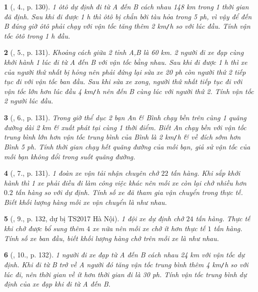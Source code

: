\documentclass{article}
\newtheorem{baitoan}{}
\begin{document}
\begin{baitoan}[\cite{Kien_dai_so_9}, 4., p. 130]
	1 ôtô dự định đi từ A đến B cách nhau {\rm148 km} trong 1 thời gian đã định. Sau khi đi được {\rm1 h} thì ôtô bị chắn bởi tàu hỏa trong {\rm5 ph}, vì vậy để đến B đúng giờ ôtô phải chạy với vận tốc tăng thêm {\rm2 km{\tt/}h} so với lúc đầu. Tính vận tốc ôtô trong {\rm1 h} đầu.
\end{baitoan}

\begin{baitoan}[\cite{Kien_dai_so_9}, 5., p. 131]
	Khoảng cách giữa 2 tỉnh A,B là {\rm60 km}. 2 người đi xe đạp cùng khởi hành 1 lúc đi từ A đến B với vận tốc bằng nhau. Sau khi đi được {\rm1 h} thì xe của người thứ nhất bị hỏng nên phải đứng lại sửa xe {\rm20 ph} còn người thứ 2 tiếp tục đi với vận tốc ban đầu. Sau khi sửa xe xong, người thứ nhất tiếp tục đi với vận tốc lớn hơn lúc đầu {\rm4 km{\tt/}h} nên đến B cùng lúc với người thứ 2. Tính vận tốc 2 người lúc đầu.
\end{baitoan}

\begin{baitoan}[\cite{Kien_dai_so_9}, 6., p. 131]
	Trong giờ thể dục 2 bạn An \& Bình chạy bền trên cùng 1 quãng đường dài {\rm2 km} \& xuất phát tại cùng 1 thời điểm. Biết An chạy bền với vận tốc trung bình lớn hơn vận tốc trung bình của Bình là {\rm2 km{\tt/}h} \& về đích sớm hơn Bình {\rm5 ph}. Tính thời gian chạy hết quãng đường của mỗi bạn, giả sử vận tốc của mỗi bạn không đổi trong suốt quãng đường.
\end{baitoan}

\begin{baitoan}[\cite{Kien_dai_so_9}, 7., p. 131]
	1 đoàn xe vận tải nhận chuyên chở $22$ tấn hàng. Khi sắp khởi hành thì 1 xe phải điều đi làm công việc khác nên mỗi xe còn lại chở nhiều hơn $0.2$ tấn hàng so với dự định. Tính số xe đã tham gia vận chuyển trong thực tế. Biết khối lượng hàng mỗi xe vận chuyển là như nhau.
\end{baitoan}

\begin{baitoan}[\cite{Kien_dai_so_9}, 9., p. 132, dự bị TS2017 Hà Nội]
	1 đội xe dự định chở $24$ tấn hàng. Thực tế khi chở được bổ sung thêm $4$ xe nữa nên mỗi xe chở ít hơn thực tế $1$ tấn hàng. Tính số xe ban đầu, biết khối lượng hàng chở trên mỗi xe là như nhau.
\end{baitoan}

\begin{baitoan}[\cite{Kien_dai_so_9}, 10., p. 132]
	1 người đi xe đạp từ A đến B cách nhau {\rm24 km} với vận tốc dự định. Khi đi từ B trở về A người đó tăng vận tốc trung bình thêm {\rm4 km{\tt/}h} so với lúc đi, nên thời gian về ít hơn thời gian đi là {\rm30 ph}. Tính vận tốc trung bình dự định của xe đạp khi đi từ A đến B.
\end{baitoan}
\end{document}

